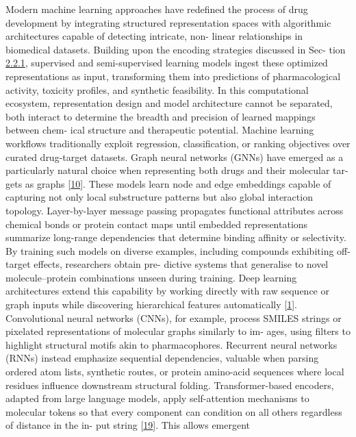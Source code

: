 \documentclass[
]{article}
\begin{document}
Modern machine learning approaches have redefined the process of drug
development by integrating structured representation spaces with
algorithmic architectures capable of detecting intricate, non- linear
relationships in biomedical datasets. Building upon the encoding
strategies discussed in Sec- tion
\protect\hyperlink{feature-encoding-and-transformation}{2.2.1},
supervised and semi-supervised learning models ingest these optimized
representations as input, transforming them into predictions of
pharmacological activity, toxicity profiles, and synthetic feasibility.
In this computational ecosystem, representation design and model
architecture cannot be separated, both interact to determine the breadth
and precision of learned mappings between chem- ical structure and
therapeutic potential. Machine learning workflows traditionally exploit
regression, classification, or ranking objectives over curated
drug-target datasets. Graph neural networks (GNNs) have emerged as a
particularly natural choice when representing both drugs and their
molecular tar- gets as graphs {[}\protect\hyperlink{_bookmark50}{10}{]}.
These models learn node and edge embeddings capable of capturing not
only local substructure patterns but also global interaction topology.
Layer-by-layer message passing propagates functional attributes across
chemical bonds or protein contact maps until embedded representations
summarize long-range dependencies that determine binding affinity or
selectivity. By training such models on diverse examples, including
compounds exhibiting off-target effects, researchers obtain pre- dictive
systems that generalise to novel molecule--protein combinations unseen
during training. Deep learning architectures extend this capability by
working directly with raw sequence or graph inputs while discovering
hierarchical features automatically
{[}\protect\hyperlink{_bookmark41}{1}{]}. Convolutional neural networks
(CNNs), for example, process SMILES strings or pixelated representations
of molecular graphs similarly to im- ages, using filters to highlight
structural motifs akin to pharmacophores. Recurrent neural networks
(RNNs) instead emphasize sequential dependencies, valuable when parsing
ordered atom lists, synthetic routes, or protein amino-acid sequences
where local residues influence downstream structural folding.
Transformer-based encoders, adapted from large language models, apply
self-attention mechanisms to molecular tokens so that every component
can condition on all others regardless of distance in the in- put string
{[}\protect\hyperlink{_bookmark59}{19}{]}. This allows emergent
\end{document}
